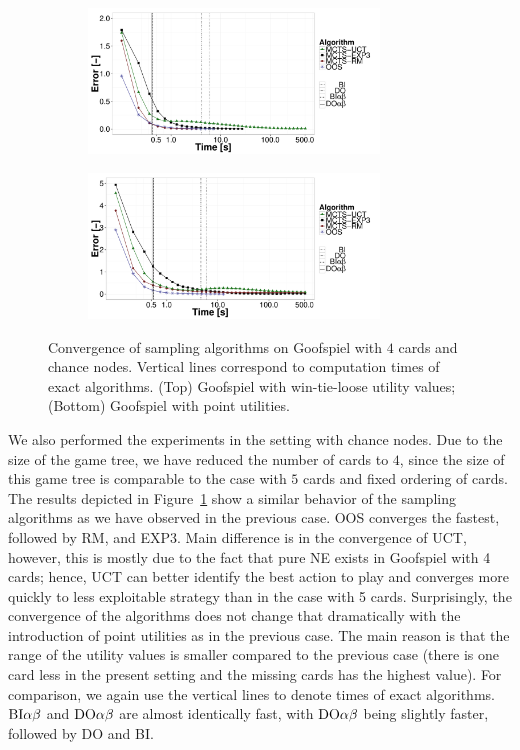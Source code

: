 \begin{figure}[t]
	\begin{subfigure}{1\textwidth}
		\centering
		\includegraphics[width=0.85\textwidth]{figures/convergence-gs-tn.pdf}%
	\end{subfigure}
	\begin{subfigure}{1\textwidth}
		\centering
		\includegraphics[width=0.85\textwidth]{figures/convergence-gs-fn.pdf}%
	\end{subfigure}
\caption{Convergence of sampling algorithms on Goofspiel with $4$ cards and chance nodes.
Vertical lines correspond to computation times of exact algorithms.
(Top) Goofspiel with win-tie-loose utility values; 
(Bottom) Goofspiel with point utilities.} \label{fig:off:conv:gsn}
\end{figure}

We also performed the experiments in the setting with chance nodes.
Due to the size of the game tree, we have reduced the number of cards to $4$, since the size of this game tree is comparable to the case with $5$ cards and fixed ordering of cards.
The results depicted in Figure~\ref{fig:off:conv:gsn} show a similar behavior of the sampling algorithms as we have observed in the previous case.
OOS converges the fastest, followed by RM, and EXP3.
Main difference is in the convergence of UCT, however, this is mostly due to the fact that pure NE exists in Goofspiel with 4 cards; hence, UCT can better identify the best action to play and converges more quickly to less exploitable strategy than in the case with 5 cards.
Surprisingly, the convergence of the algorithms does not change that dramatically with the introduction of point utilities as in the previous case.
The main reason is that the range of the utility values is smaller compared to the previous case (there is one card less in the present setting and the missing cards has the highest value).
For comparison, we again use the vertical lines to denote times of exact algorithms.
$\textrm{BI}\alpha\beta$ and $\textrm{DO}\alpha\beta$ are almost identically fast, with $\textrm{DO}\alpha\beta$ being slightly faster, followed by \textsc{DO} and \textsc{BI}.


